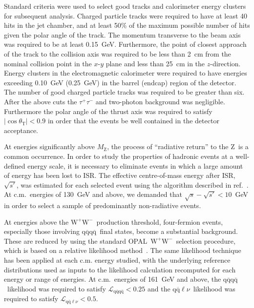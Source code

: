 \documentclass[12pt,a4paper,twoside]{article}
\newcommand{\qqbar}  {\ensuremath{\mathrm{q\overline{q}}}}
\newcommand{\lnu}    {\ensuremath{\ell\nu}}
\newcommand{\zzero}  {\ensuremath{\mathrm{Z}}}
\newcommand{\mz}     {\ensuremath{M_{\mathrm{Z}}}}
\newcommand{\ww}     {\ensuremath{\mathrm{W^+W^-}}}
\newcommand{\Opal}{\mbox{\rm OPAL}}
\newcommand{\isr}{\mbox{ISR}}
\begin{document}
Standard criteria were used to select good tracks and calorimeter energy 
clusters for subsequent analysis.  Charged particle tracks were 
required to have at least 40 hits in the jet chamber, and at least 
50\% of the maximum possible number of hits given the polar angle
of the track. The momentum transverse to the beam axis was required to
be at least 0.15~GeV.  Furthermore, 
the point of closest approach of the track to the collision 
axis was required to be less than 2~cm from the nominal collision point
in the $x$-$y$ plane and less than 25~cm in the $z$-direction.
Energy clusters in the electromagnetic calorimeter were required 
to have energies exceeding 0.10~GeV (0.25~GeV) in the barrel (endcap)
region of the detector.
The number of good charged particle tracks
was required to be greater than six.  After the above cuts 
the $\tau^+\tau^-$ and two-photon background was negligible.
Furthermore the polar angle of the thrust axis was required to satisfy
$|\cos\theta_{\mathrm{T}}|<0.9$ in order that the events 
be well contained in the detector acceptance.   

At energies significantly above \mz, the process of 
``radiative return'' to the \zzero\ is a common occurrence.
In order to study the properties of hadronic events at a well-defined
energy scale, it is necessary to eliminate events in which a large amount
of energy has been lost to \isr.  The effective centre-of-mass energy 
after \isr, $\sqrt{s'}$, was estimated for each selected event using
the algorithm described in ref.~\cite{OPALPR388}.  At c.m.\ energies
of 130~GeV and above, we demanded 
that $\sqrt{s}-\sqrt{s'}<10$~GeV in order to 
select a sample of predominantly non-radiative events.

At energies above the \ww\ production threshold, four-fermion events, 
especially those involving \qqbar\qqbar\ final states, become a substantial      
background.  These are reduced by using the standard \Opal\ \ww\ selection
procedure, which is based on a relative likelihood method~\cite{OPALPR321}.
The same likelihood technique 
has been applied at each c.m. energy studied, 
with the underlying reference distributions used as 
inputs to the likelihood calculation
recomputed for each energy or 
range of energies.  At  c.m.\ energies of 161~GeV and above,
the \qqbar\qqbar\
likelihood was required to satisfy $\mathcal{L}_{\qqbar\qqbar}<0.25$ and 
the \qqbar\lnu\ likelihood was required 
to satisfy $\mathcal{L}_{\qqbar\lnu}<0.5$.
\end{document}
